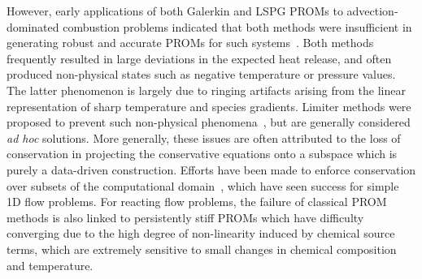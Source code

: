 However, early applications of both Galerkin and LSPG PROMs to advection-dominated combustion problems indicated that both methods were insufficient in generating robust and accurate PROMs for such systems~\cite{Huang2018b,Huang2019}. Both methods frequently resulted in large deviations in the expected heat release, and often produced non-physical states such as negative temperature or pressure values. The latter phenomenon is largely due to ringing artifacts arising from the linear representation of sharp temperature and species gradients. Limiter methods were proposed to prevent such non-physical phenomena~\cite{Huang2019,Huang2020}, but are generally considered \textit{ad hoc} solutions. More generally, these issues are often attributed to the loss of conservation in projecting the conservative equations onto a subspace which is purely a data-driven construction. Efforts have been made to enforce conservation over subsets of the computational domain~\cite{carlberg_conservative_rom,Lee2021}, which have seen success for simple 1D flow problems. For reacting flow problems, the failure of classical PROM methods is also linked to persistently stiff PROMs which have difficulty converging due to the high degree of non-linearity induced by chemical source terms, which are extremely sensitive to small changes in chemical composition and temperature. 